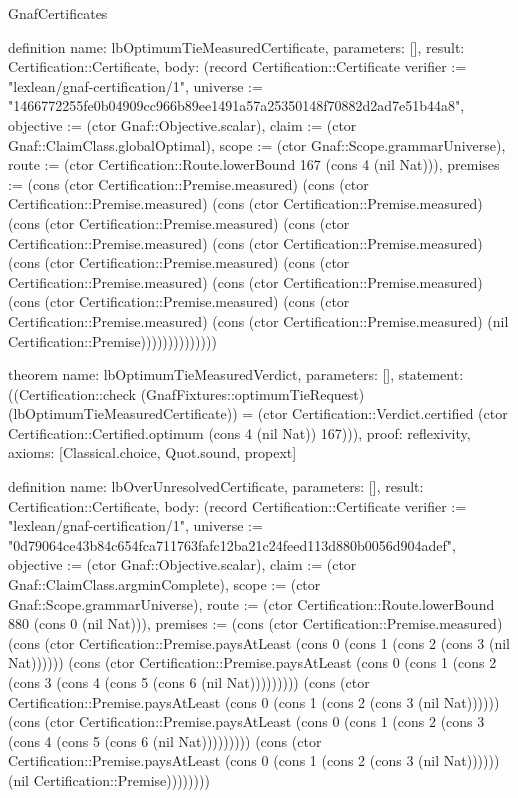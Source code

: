 \begin{lexlean}{GnafCertificates}
\begin{semanticmodule}
definition{
  name: lbOptimumTieMeasuredCertificate,
  parameters: [],
  result: Certification::Certificate,
  body: (record Certification::Certificate {verifier := "lexlean/gnaf-certification/1", universe := "1466772255fe0b04909cc966b89ee1491a57a25350148f70882d2ad7e51b44a8", objective := (ctor Gnaf::Objective.scalar), claim := (ctor Gnaf::ClaimClass.globalOptimal), scope := (ctor Gnaf::Scope.grammarUniverse), route := (ctor Certification::Route.lowerBound 167 (cons 4 (nil Nat))), premises := (cons (ctor Certification::Premise.measured) (cons (ctor Certification::Premise.measured) (cons (ctor Certification::Premise.measured) (cons (ctor Certification::Premise.measured) (cons (ctor Certification::Premise.measured) (cons (ctor Certification::Premise.measured) (cons (ctor Certification::Premise.measured) (cons (ctor Certification::Premise.measured) (cons (ctor Certification::Premise.measured) (cons (ctor Certification::Premise.measured) (cons (ctor Certification::Premise.measured) (cons (ctor Certification::Premise.measured) (nil Certification::Premise)))))))))))))})
}

theorem{
  name: lbOptimumTieMeasuredVerdict,
  parameters: [],
  statement: ((Certification::check (GnafFixtures::optimumTieRequest) (lbOptimumTieMeasuredCertificate)) = (ctor Certification::Verdict.certified (ctor Certification::Certified.optimum (cons 4 (nil Nat)) 167))),
  proof: reflexivity{},
  axioms: [Classical.choice, Quot.sound, propext]
}

definition{
  name: lbOverUnresolvedCertificate,
  parameters: [],
  result: Certification::Certificate,
  body: (record Certification::Certificate {verifier := "lexlean/gnaf-certification/1", universe := "0d79064ce43b84c654fca711763fafc12ba21c24feed113d880b0056d904adef", objective := (ctor Gnaf::Objective.scalar), claim := (ctor Gnaf::ClaimClass.argminComplete), scope := (ctor Gnaf::Scope.grammarUniverse), route := (ctor Certification::Route.lowerBound 880 (cons 0 (nil Nat))), premises := (cons (ctor Certification::Premise.measured) (cons (ctor Certification::Premise.paysAtLeast (cons 0 (cons 1 (cons 2 (cons 3 (nil Nat)))))) (cons (ctor Certification::Premise.paysAtLeast (cons 0 (cons 1 (cons 2 (cons 3 (cons 4 (cons 5 (cons 6 (nil Nat))))))))) (cons (ctor Certification::Premise.paysAtLeast (cons 0 (cons 1 (cons 2 (cons 3 (nil Nat)))))) (cons (ctor Certification::Premise.paysAtLeast (cons 0 (cons 1 (cons 2 (cons 3 (cons 4 (cons 5 (cons 6 (nil Nat))))))))) (cons (ctor Certification::Premise.paysAtLeast (cons 0 (cons 1 (cons 2 (cons 3 (nil Nat)))))) (nil Certification::Premise)))))))})
}


\end{semanticmodule}
\end{lexlean}
